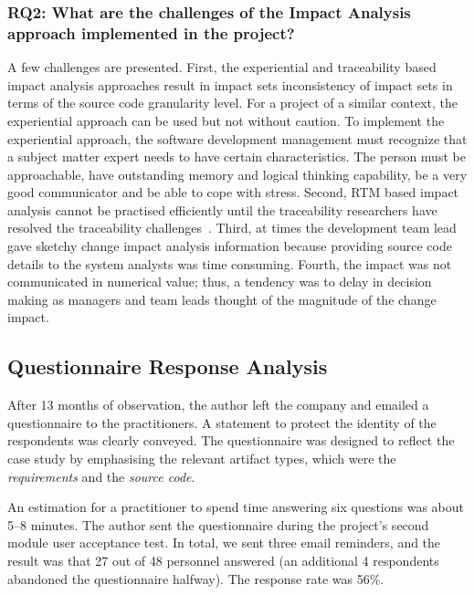 \documentclass[conference]{IEEEtran}
\begin{document}

\subsubsection{RQ2: What are the challenges of the Impact Analysis
  approach implemented in the project?}

A few challenges are presented. First, the experiential and
traceability based impact analysis approaches result in impact sets
inconsistency of impact sets in terms of the source code granularity
level. For a project of a similar context, the experiential approach
can be used but not without caution. To implement the experiential
approach, the software development management must recognize that a
subject matter expert needs to have certain characteristics. The
person must be approachable, have outstanding memory and logical
thinking capability, be a very good communicator and be able to cope
with stress. Second, RTM based impact analysis cannot be practised
efficiently until the traceability researchers have resolved the
traceability challenges~\cite{gotel2012grand}.
Third, at times the development team lead gave sketchy change impact
analysis information because providing source code details to the
system analysts was time consuming. Fourth, the impact was not
communicated in numerical value; thus, a tendency was to delay in
decision making as managers and team leads thought of the magnitude of
the change impact.

\subsection{Questionnaire Response Analysis}

After 13 months of observation, the author left the company and
emailed a questionnaire to the practitioners.  A statement to protect
the identity of the respondents was clearly conveyed. The
questionnaire was designed to reflect the case study by emphasising
the relevant artifact types, which were the \emph{requirements} and
the \emph{source code}.

An estimation for a practitioner to spend time answering six questions
was about 5--8 minutes. The author sent the questionnaire during the
project's second module user acceptance test. In total, we sent three
email reminders, and the result was that 27 out of 48 personnel
answered (an additional 4 respondents abandoned the questionnaire
halfway). The response rate was 56\%. 
\end{document}
